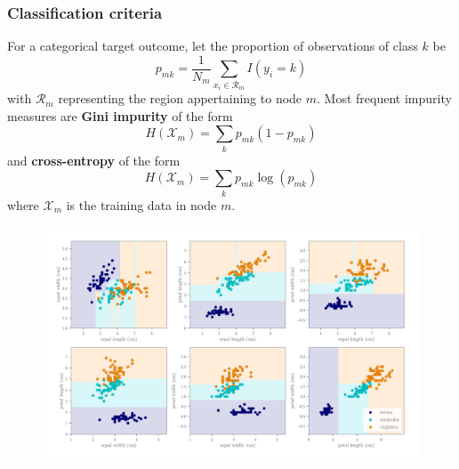 \documentclass[11pt]{article}
\theoremstyle{plain}
\theoremstyle{definition}
\begin{document}
\subsubsection{Classification criteria}
For a categorical target outcome, let the proportion of observations of class $k$ be
\begin{equation}
p_{mk} = \frac{1}{N_m}\sum_{x_i\in \mathcal{R}_m} I(y_i=k)
\end{equation}
with $\mathcal{R}_m$ representing the region appertaining to node $m$. Most frequent impurity measures are \textbf{Gini impurity} of the form
\begin{equation}
H(\mathcal{X}_m) = \sum_k p_{mk}(1-p_{mk})
\end{equation}
and \textbf{cross-entropy} of the form
\begin{equation}
H(\mathcal{X}_m) = \sum_k p_{mk}\log(p_{mk})
\end{equation}
where $\mathcal{X}_m$ is the training data in node $m$.
\begin{figure}[h!]
	\includegraphics[width=\linewidth]{./img/tree_decision_surface.pdf}
\end{figure}
\end{document}
